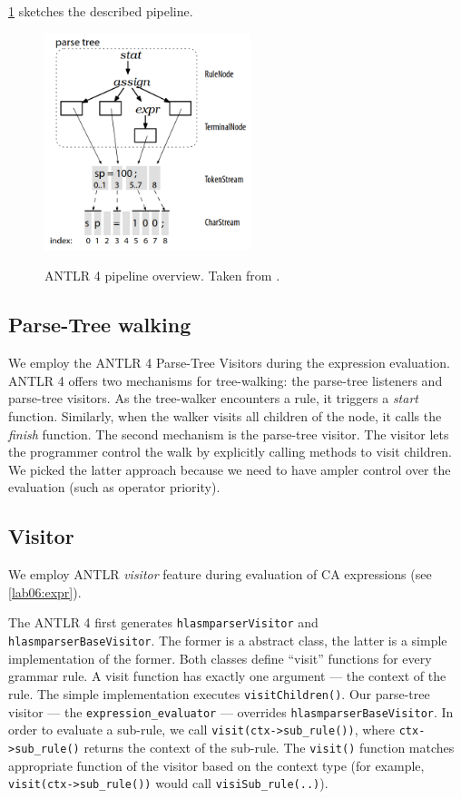 \cref{antlr_pipeline} sketches the described pipeline.

\begin{figure}[H]
	\centering
	\includegraphics[width=6cm]{img/antlr_pipeline}
	\label{antlr_pipeline}
	\caption{ANTLR 4 pipeline overview. Taken from \cite{parr2013definitive}.}
\end{figure}

\subsection{Parse-Tree walking}

We employ the ANTLR 4 Parse-Tree Visitors during the expression evaluation. ANTLR 4 offers two mechanisms for tree-walking: the parse-tree listeners and parse-tree visitors. As the tree-walker encounters a rule, it triggers a \emph{start} function. Similarly, when the walker visits all children of the node, it calls the \emph{finish} function.  The second mechanism is the parse-tree visitor. The visitor lets the programmer control the walk by explicitly calling methods to visit children. We picked the latter approach because we need to have ampler control over the evaluation (such as operator priority).

\subsection{Visitor}

We employ ANTLR \emph{visitor} feature during evaluation of CA expressions (see \cref{lab06:expr}). 

The ANTLR 4 first generates \texttt{hlasmparserVisitor} and \texttt{hlasmparserBaseVisitor}. The former is a abstract class, the latter is a simple implementation of the former. Both classes define ``visit'' functions for every grammar rule. A visit function has exactly one argument --- the context of the rule. The simple implementation executes \texttt{visitChildren()}. Our parse-tree visitor --- the \texttt{expression\_evaluator} --- overrides \texttt{hlasmparserBaseVisitor}. In order to evaluate a sub-rule, we call \texttt{visit(ctx->sub\_rule())}, where \texttt{ctx->sub\_rule()} returns the context of the sub-rule. The \texttt{visit()} function matches appropriate function of the visitor based on the context type (for example, \texttt{visit(ctx->sub\_rule())} would call \texttt{visiSub\_rule(..)}).

